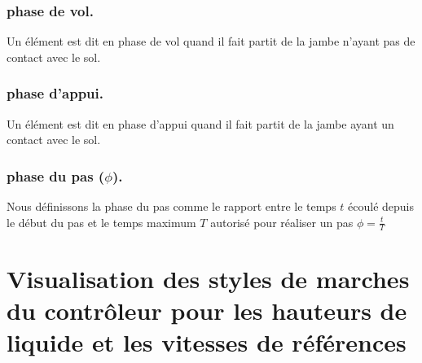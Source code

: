 \documentclass[runningheads,a4paper]{llncs}
\begin{document}
\subsubsection{phase de vol.} Un élément est dit en phase de vol quand il fait partit de la jambe n'ayant pas de contact avec le sol.

\subsubsection{phase d'appui.} Un élément est dit en phase d'appui quand il fait partit de la jambe ayant un contact avec le sol.

\subsubsection{phase du pas ($\phi$).} Nous définissons la phase du pas comme le rapport entre le temps $t$ écoulé depuis le début du pas et le temps maximum $T$ autorisé pour réaliser un pas $\phi=\frac{t}{T}$


\section{Visualisation des styles de marches du contrôleur pour les hauteurs de liquide et les vitesses de références}
\label{sec:complex_controler}

\newpage
\end{document}
